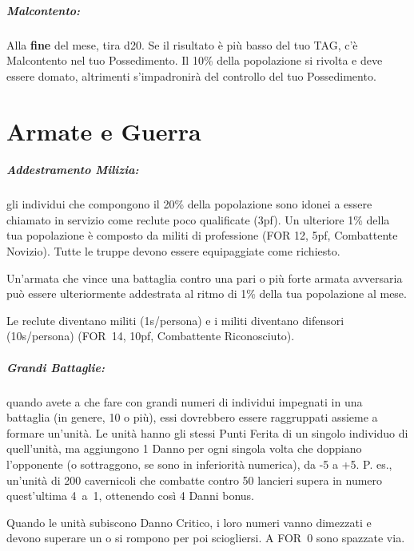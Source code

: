 \documentclass[itdr]{subfiles}
\begin{document}
\subparagraph{Malcontento:} Alla \textbf{fine} del mese, tira d20. Se il risultato è più basso del tuo TAG, c’è Malcontento nel tuo Possedimento. Il 10\% della popolazione si rivolta e deve essere domato, altrimenti s’impadronirà del controllo del tuo Possedimento. 

\vfill
\section{Armate e Guerra}


\subparagraph{Addestramento Milizia:} gli individui che compongono il 20\% della popolazione sono idonei a essere chiamato in servizio come reclute poco qualificate (3pf). Un ulteriore 1\% della tua popolazione è composto da militi di professione (FOR 12, 5pf, Combattente Novizio). Tutte le truppe devono essere equipaggiate come richiesto.

Un’armata che vince una battaglia contro una pari o più forte armata avversaria può essere ulteriormente addestrata al ritmo di 1\% della tua popolazione al mese. 

Le reclute diventano militi (1s/persona) e i \mbox{militi} diventano difensori (10s/persona) (FOR~14, 10pf, Combattente Riconosciuto).

\vfill
\break

\subparagraph{Grandi Battaglie:} quando avete a che fare con grandi numeri di individui impegnati in una battaglia (in genere, 10 o più), essi dovrebbero essere raggruppati assieme a formare un’unità. Le unità hanno gli stessi Punti Ferita di un singolo individuo di quell’unità, ma aggiungono 1 Danno per ogni singola volta che doppiano l’opponente (o sottraggono, se sono in inferiorità numerica), da -5 a +5. P. es., un’unità di 200 cavernicoli che combatte contro 50 lancieri supera in numero quest’ultima \mbox{4 a 1}, ottenendo così 4 Danni bonus.

Quando le unità subiscono Danno Critico, i loro numeri vanno dimezzati e devono superare un  o si rompono per poi sciogliersi. A FOR~0 sono spazzate via.
\end{document}
